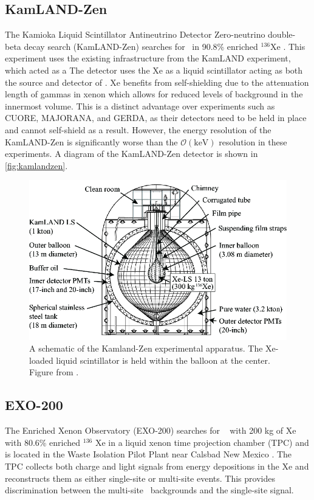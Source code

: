 \subsection{KamLAND-Zen}
The Kamioka Liquid Scintillator Antineutrino Detector Zero-neutrino double-beta decay search (KamLAND-Zen) searches for \zeronubb~in 90.8\% enriched $^{136}$Xe \cite{KamLAND-Zen:2016pfg}. This experiment uses the existing infrastructure from the KamLAND experiment, which acted as a  The detector uses the Xe as a liquid scintillator acting as both the source and detector of \zeronubb. Xe benefits from self-shielding due to the attenuation length of gammas in xenon which allows for reduced levels of background in the innermost volume. This is a distinct advantage over experiments such as CUORE, MAJORANA, and GERDA, as their detectors need to be held in place and cannot self-shield as a result. However, the energy resolution of the KamLAND-Zen is significantly worse than the $\mathcal{O}(\textrm{keV})$ resolution in these experiments. A diagram of the KamLAND-Zen detector is shown in \autoref{fig:kamlandzen}.

\begin{figure}[tbph]
\centering
\includegraphics[width=0.7\linewidth]{Figures/KamlandZen}
\caption[A schematic of the Kamland-Zen experimental apparatus.]{A schematic of the Kamland-Zen experimental apparatus. The Xe-loaded liquid scintillator is held within the balloon at the center. Figure from \cite{::2015uaa}.}
\label{fig:kamlandzen}
\end{figure}

\subsection{EXO-200}
The Enriched Xenon Observatory (EXO-200) searches for \zeronubb~ with 200 kg of Xe with 80.6\% enriched $^{136}$ Xe in a liquid xenon time projection chamber (TPC) and is located in the Waste Isolation Pilot Plant near Calsbad New Mexico \cite{Albert:2017owj}. The TPC collects both charge and light signals from energy depositions in the Xe and reconstructs them as either single-site or multi-site events. This provides discrimination between the multi-site \gamma~backgrounds and the single-site signal.

